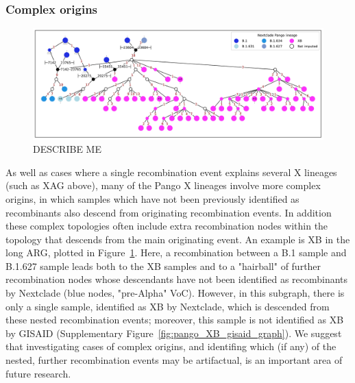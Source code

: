 \documentclass{article}
\begin{document}
\subsubsection{Complex origins}
\begin{figure} \centering
\includegraphics[width=\textwidth]{figures/Pango_XB_nxcld_tight_graph.pdf}
\caption{\label{fig:complex_origins_graph}  DESCRIBE ME}
\end{figure}

As well as cases where a single recombination event explains several X lineages
(such as XAG above), many of the Pango X lineages involve more complex origins,
in which samples which have not been previously identified as recombinants also
descend from originating recombination events. In addition these complex
topologies often include extra recombination nodes within the topology that
descends from the main originating event. An example is XB in the long ARG,
plotted in Figure~\ref{fig:complex_origins_graph}. Here, a recombination
between a B.1 sample and B.1.627 sample leads both to the XB samples and to a
"hairball" of further recombination nodes whose descendants have not been
identified as recombinants by Nextclade (blue nodes, "pre-Alpha" VoC). However,
in this subgraph, there is only a single sample, identified as XB by Nextclade,
which is descended from these nested recombination events; moreover, this
sample is not identified as XB by GISAID (Supplementary
Figure~\ref{fig:pango_XB_gisaid_graph}). We suggest that investigating cases of
complex origins, and identifing which (if any) of the nested, further
recombination events may be artifactual, is an important area of future
research.


\end{document}
